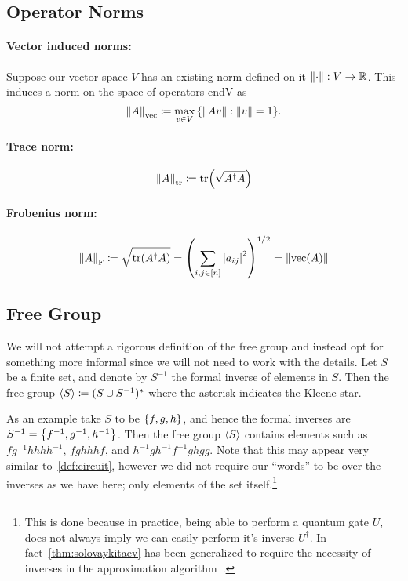 \subsection{Operator Norms}

\paragraph{Vector induced norms:}
Suppose our vector space $V$ has an existing norm defined on it $\norm{\cdot}: V \to \mathbb{R}$.
This induces a norm on the space of operators \gls{endV} as
\begin{equation}
    \norm{A}_\text{vec} \coloneqq \max_{v \in V}\qty{\norm{A v}: \norm{v} = 1}.
\end{equation}

\paragraph{Trace norm:}
\begin{equation}
    \norm{A}_\text{tr} \coloneqq \tr(\sqrt{A^\dagger A})
\end{equation}

\paragraph{Frobenius norm:}
\begin{equation}
    \norm{A}_\text{F} \coloneqq \sqrt{\tr(A^\dagger A)} = \qty(\sum_{i, j \in [n]}\abs{a_{ij}}^2)^{1/2} = \norm{\operatorname{vec}(A)}
\end{equation}


\subsection{Free Group}
We will not attempt a rigorous definition of the free group and instead opt for something more informal since we will not need to work with the details.
Let $S$ be a finite set, and denote by $S^{-1}$ the formal inverse of elements in $S$.
Then the free group $\expval{S} \coloneqq (S\cup S^{-1})^*$ where the asterisk indicates the Kleene star.

As an example take $S$ to be $\qty{f, g, h}$, and hence the formal inverses are $S^{-1} = \qty{f^{-1}, g^{-1}, h^{-1}}$.
Then the free group $\expval{S}$ contains elements such as $fg^{-1}hhhh^{-1}$, $fghhhf$, and $h^{-1}gh^{-1}f^{-1}ghgg$.
Note that this may appear very similar to~\cref{def:circuit}, however we did not require our ``words'' to be over the inverses as we have here; only elements of the set itself.\footnote{This is done because in practice, being able to perform a quantum gate $U$, does not always imply we can easily perform it's inverse $U^\dagger$. In fact~\cref{thm:solovaykitaev} has been generalized to require the necessity of inverses in the approximation algorithm~\cite{inverse-free-sk}.}

